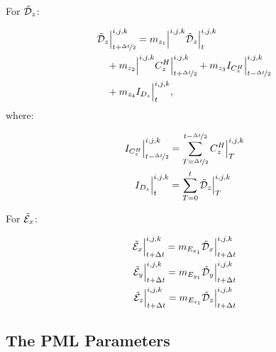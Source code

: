 For $\tilde{\mathcal{D}}_z$:

\begin{align}
    &\tilde{\mathcal{D}}_z\Big|_{t+\nicefrac{\Delta t}{2}}^{i,j,k} = m_{{z_1}}\Big|^{i,j,k} \tilde{\mathcal{D}}_z\Big|_{t}^{i,j,k} 
    \nonumber \\
    & \quad + m_{{z_2}}\Big|^{i,j,k}C_z^H\Big|^{i,j,k}_{t+\nicefrac{\Delta t}{2}} + m_{{z_3}} I_{C^H_z}\Big|^{i,j,k}_{t-\nicefrac{\Delta t}{2}} 
    \nonumber \\
    & \quad + m_{{z_4}} I_{D_z}\Big|^{i,j,k}_{t},
\end{align}
where:

\begin{align}
    I_{C^H_z}\Big|^{i,j,k}_{t-\nicefrac{\Delta t}{2}} &= \sum\limits_{T=\nicefrac{\Delta t}{2}}^{t-\nicefrac{\Delta t}{2}}C_z^H\Big|^{i,j,k}_T
    \\
    I_{D_z}\Big|^{i,j,k}_{t} &= \sum\limits_{T=0}^{t} \tilde{\mathcal{D}}_z\Big|^{i,j,k}_T
\end{align}

For $\tilde{\mathcal{E}}_x$:

\begin{align}
    \tilde{\mathcal{E}}_x\Big|^{i,j,k}_{t+\Delta t} = m_{E_{x_1}} \tilde{\mathcal{D}}_x\Big|^{i,j,k}_{t+\Delta t} \\
    \tilde{\mathcal{E}}_y\Big|^{i,j,k}_{t+\Delta t} = m_{E_{y_1}} \tilde{\mathcal{D}}_y\Big|^{i,j,k}_{t+\Delta t} \\
    \tilde{\mathcal{E}}_z\Big|^{i,j,k}_{t+\Delta t} = m_{E_{z_1}} \tilde{\mathcal{D}}_z\Big|^{i,j,k}_{t+\Delta t}
\end{align}

\subsection{The PML Parameters}




